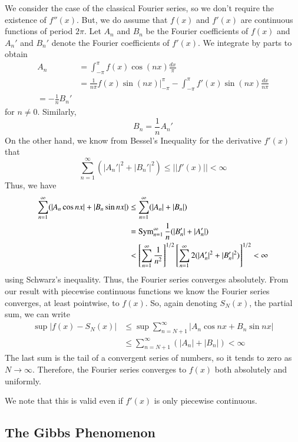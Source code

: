 \documentclass[12pt, a4paper, oneside, openright, titlepage]{book}
\begin{document}
We consider the case of the classical Fourier series, so we don't require the existence of $f''(x)$. But, we do assume that $f(x)$ and $f'(x)$ are continuous functions of period $2\pi$. Let $A_n$ and $B_n$ be the Fourier coefficients of $f(x)$ and $A_n'$ and $B_n'$ denote the Fourier coefficients of $f'(x)$. We integrate by parts to obtain \begin{align*}
    A_n &= \int_{-\pi}^{\pi}f(x)\cos(nx)\frac{dx}{\pi} \\
    &= \frac{1}{n\pi}f(x)\sin(nx)\Bigg\rvert_{-\pi}^{\pi} - \int_{-\pi}^{\pi}f'(x)\sin(nx)\frac{dx}{n\pi} \\
    = - \frac{1}{n}B_n'
\end{align*}
for $n \neq 0$. Similarly, \begin{equation*}
    B_n = \frac{1}{n}A_n'
\end{equation*}
On the other hand, we know from Bessel's Inequality for the derivative $f'(x)$ that \begin{equation*}
    \sum_{n=1}^{\infty}(|A_n'|^2+|B_n'|^2) \leq ||f'(x)|| < \infty
\end{equation*}
Thus, we have \begin{align*}
    \sum_{n=1}^{\infty}(|A_n\cos nx| + |B_n\sin nx|) &\leq \sum_{n=1}^{\infty}(|A_n|+|B_n|) \\
    &= \operatorname{Sym}_{n=1}^{\infty}\frac{1}{n}(|B_n'|+|A_n'|) \\
    &< \left[\sum_{n=1}^{\infty}\frac{1}{n^2}\right]^{1/2}\left[\sum_{n=1}^{\infty}2(|A_n'|^2+|B_n'|^2)\right]^{1/2} < \infty
\end{align*}
using Schwarz's inequality. Thus, the Fourier series converges absolutely. From our result with piecewise continuous functions we know the Fourier series converges, at least pointwise, to $f(x)$. So, again denoting $S_N(x)$, the partial sum, we can write \begin{align*}
    \sup|f(x) - S_N(x)| &\leq \sup\sum_{n=N+1}^{\infty}|A_n\cos nx+B_n\sin nx| \\
    &\leq \sum_{n=N+1}^{\infty}(|A_n|+|B_n|) < \infty
\end{align*}
The last sum is the tail of a convergent series of numbers, so it tends to zero as $N\rightarrow \infty$. Therefore, the Fourier series converges to $f(x)$ both absolutely and uniformly. 

We note that this is valid even if $f'(x)$ is only piecewise continuous.

\subsection{The Gibbs Phenomenon}
\end{document}
